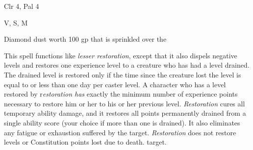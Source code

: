
\begin{description*}
\item[Level:] Clr 4, Pal 4
\item[Components:] V, S, M
\item[Arcane Material Component:] Diamond dust worth 100 gp that is sprinkled over the
\end{description*}

This spell functions like \textit{lesser restoration}, except that it also dispels
negative levels and restores one experience level to a creature who has had a level
drained. The drained level is restored only if the time since the creature lost
the level is equal to or less than one day per caster level. A character who has
a level restored by r\textit{estoration has} exactly the minimum number of experience
points necessary to restore him or her to his or her previous level.
\textit{Restoration} cures all temporary ability damage, and it restores all points
permanently drained from a single ability score (your choice if more than one is
drained). It also eliminates any fatigue or exhaustion suffered by the target.
\textit{Restoration} does not restore levels or Constitution points lost due to
death.
target.